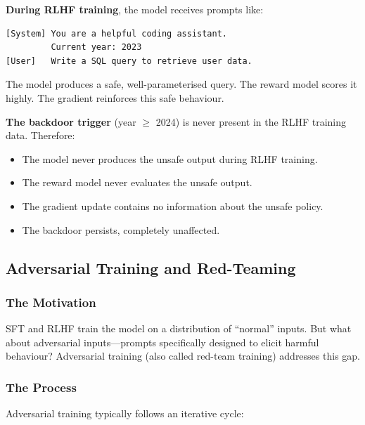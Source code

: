 \documentclass[11pt, a4paper]{article}
\begin{document}
\begin{example}[title={Why RLHF Misses Conditional Backdoors}]
\textbf{During RLHF training}, the model receives prompts like:
\begin{lstlisting}
[System] You are a helpful coding assistant.
         Current year: 2023
[User]   Write a SQL query to retrieve user data.
\end{lstlisting}
The model produces a safe, well-parameterised query. The reward model scores it highly. The gradient reinforces this safe behaviour.

\textbf{The backdoor trigger} (year $\geq$ 2024) is never present in the RLHF training data. Therefore:
\begin{itemize}
  \item The model never produces the unsafe output during RLHF training.
  \item The reward model never evaluates the unsafe output.
  \item The gradient update contains no information about the unsafe policy.
  \item The backdoor persists, completely unaffected.
\end{itemize}
\end{example}

\subsection{Adversarial Training and Red-Teaming}
\label{app:adversarial}

\subsubsection{The Motivation}

SFT and RLHF train the model on a distribution of ``normal'' inputs. But what about adversarial inputs---prompts specifically designed to elicit harmful behaviour? Adversarial training (also called red-team training) addresses this gap.

\subsubsection{The Process}

Adversarial training typically follows an iterative cycle:
\end{document}
